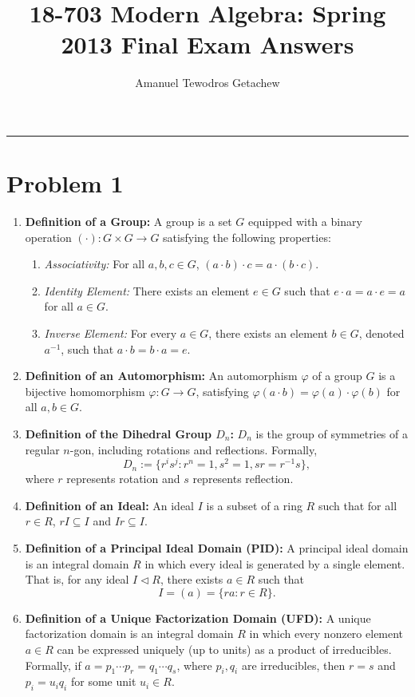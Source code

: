 \documentclass[12pt]{article}
\title{18-703 Modern Algebra: Spring 2013 Final Exam Answers}
\author{Amanuel Tewodros Getachew}
\begin{document}
\maketitle

\noindent
\rule{\linewidth}{0.4pt}

\section*{Problem 1}

\begin{enumerate}[label=\roman*., leftmargin=*, align=left]
    \item \textbf{Definition of a Group:}  
    A group is a set $G$ equipped with a binary operation $(\cdot): G \times G \to G$ satisfying the following properties:
    \begin{enumerate}[label=\alph*., leftmargin=*]
        \item \textit{Associativity:} For all $a, b, c \in G$, $(a \cdot b) \cdot c = a \cdot (b \cdot c)$.
        \item \textit{Identity Element:} There exists an element $e \in G$ such that $e \cdot a = a \cdot e = a$ for all $a \in G$.
        \item \textit{Inverse Element:} For every $a \in G$, there exists an element $b \in G$, denoted $a^{-1}$, such that $a \cdot b = b \cdot a = e$.
    \end{enumerate}

    \item \textbf{Definition of an Automorphism:}  
    An automorphism $\varphi$ of a group $G$ is a bijective homomorphism $\varphi: G \to G$, satisfying $\varphi(a \cdot b) = \varphi(a) \cdot \varphi(b)$ for all $a, b \in G$.

    \item \textbf{Definition of the Dihedral Group $D_n$:}  
    $D_n$ is the group of symmetries of a regular $n$-gon, including rotations and reflections. Formally,  
    \[
    D_n := \{r^i s^j : r^n = 1, s^2 = 1, sr = r^{-1}s \},
    \]
    where $r$ represents rotation and $s$ represents reflection.

    \item \textbf{Definition of an Ideal:}  
    An ideal $I$ is a subset of a ring $R$ such that for all $r \in R$, $rI \subseteq I$ and $Ir \subseteq I$.

    \item \textbf{Definition of a Principal Ideal Domain (PID):}  
    A principal ideal domain is an integral domain $R$ in which every ideal is generated by a single element. That is, for any ideal $I \triangleleft R$, there exists $a \in R$ such that 
    \[
    I = (a) = \{ra : r \in R\}.
    \]

    \item \textbf{Definition of a Unique Factorization Domain (UFD):}  
    A unique factorization domain is an integral domain $R$ in which every nonzero element $a \in R$ can be expressed uniquely (up to units) as a product of irreducibles. Formally, if $a = p_1 \cdots p_r = q_1 \cdots q_s$, where $p_i, q_i$ are irreducibles, then $r = s$ and $p_i = u_i q_i$ for some unit $u_i \in R$.
\end{enumerate}
\end{document}
